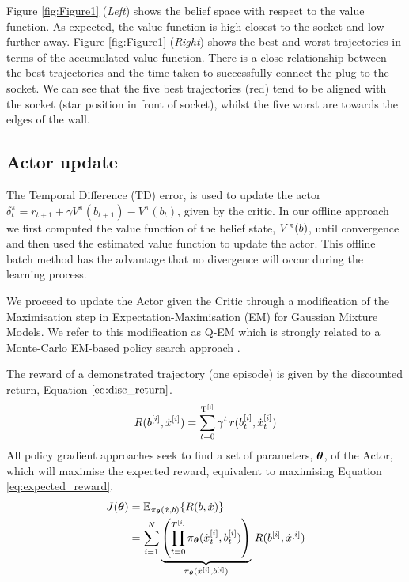 Figure \ref{fig:Figure1} (\textit{Left}) shows the belief space with respect to the value function. As expected, the 
value function is high closest to the socket and low further away. Figure \ref{fig:Figure1}
(\textit{Right}) shows the best and worst trajectories in terms of the accumulated value function. There is a
close relationship between the best trajectories and the time taken to successfully connect the plug to the socket. We can see that the five best trajectories
(red) tend to be aligned with the socket (star position in front of socket), whilst the five worst are towards the edges
of the wall.

\subsection{Actor update}

The Temporal Difference (TD) error, is used to update the actor $\delta^{\pi}_t = r_{t+1} + \gamma V^{\pi}(b_{t+1}) - V^{\pi}(b_t)$, 
given by the critic\cite[Chap. 6]{sutton1998reinforcement}. 
In our offline approach we first computed the value function of the belief state, $V^{\pi}(b)$, 
until convergence and then used the estimated value function to update the actor. This offline batch 
method has the advantage that no divergence will occur during the learning process.

We proceed to update the Actor given the Critic through a modification of the Maximisation step in  Expectation-Maximisation (EM) 
for Gaussian Mixture Models. We refer to this modification as Q-EM which is strongly related to a Monte-Carlo EM-based policy 
search approach \cite[p.50]{DeisenrothNP2013}. 

The reward of a demonstrated trajectory (one episode) is given by the discounted return, Equation $\ref{eq:disc_return}$.
\begin{equation}\label{eq:disc_return}
 R(b^{[i]},\dot{x}^{[i]}) = \sum_{t=0}^{\mathrm{T^{[i]}}} \gamma^t \, r(b^{[i]}_t,\dot{x}^{[i]}_t)
\end{equation}
All policy gradient approaches seek to find a set of parameters, $\boldsymbol{\theta}$, of the Actor,
which will maximise the expected reward, equivalent to maximising Equation \ref{eq:expected_reward}.
\begin{align}\label{eq:expected_reward}
 J(\boldsymbol{\theta}) &= \mathbb{E}_{\pi_{\boldsymbol{\theta}}(\dot{x},b)}\{R(b,\dot{x})\} \nonumber \\
	  &= \sum\limits_{i=1}^{N}   \underbrace{\left( \prod_{t=0}^{T^{[i]}} \pi_{\boldsymbol{\theta}}(\dot{x}^{[i]}_t,b^{[i]}_t) \right)}_{\pi_{\boldsymbol{\theta}}(\dot{x}^{[i]},b^{[i]})} \, R(b^{[i]},\dot{x}^{[i]}) 
\end{align}

